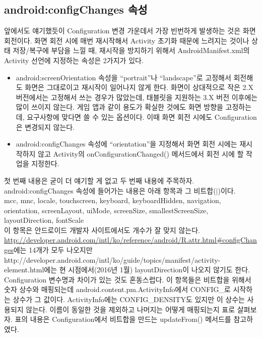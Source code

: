 \subsection{android:configChanges 속성}
앞에서도 얘기했듯이 Configuration 변경 가운데서 가장 빈번하게 발생하는 것은 화면 회전이다. 화면 회전 시에 매번 재시작해서 Activity 초기화 때문에 느려지는 것이나 상태 저장/복구에 부담을 느낄 때, 재시작을 방지하기 위해서 AndroidManifest.xml의 Activity 선언에 지정하는 속성은 2가지가 있다.
\begin{itemize}
\item android:screenOrientation 속성을 ``portrait''나 ``landscape''로 고정해서 회전해도 화면은 그대로이고 재시작이 일어나지 않게 한다. 화면이 상대적으로 작은 2.X 버전에서는 고정해서 쓰는 경우가 많았는데, 태블릿을 지원하는 3.X 버전 이후에는 많이 쓰이지 않는다. 게임 앱과 같이 용도가 확실한 것에도 화면 방향을 고정하는데, 요구사항에 맞다면 쓸 수 있는 옵션이다. 이때 화면 회전 시에도 Configuration은 변경되지 않는다.
\item android:configChanges 속성에 ``orientation''을 지정해서 화면 회전 시에는 재시작하지 않고 Activity의 onConfigurationChanged() 메서드에서 회전 시에 할 작업을 지정한다.
\end{itemize}

첫 번째 내용은 굳이 더 얘기할 게 없고 두 번째 내용에 주목하자.
android:configChanges 속성에 들어가는 내용은 아래 항목과 그 비트합($|$)이다.\\
mcc, mnc, locale,
touchscreen, keyboard, keyboardHidden, 
navigation, orientation, screenLayout, uiMode, screenSize,
smallestScreenSize, layoutDirection, fontScale\\

이 항목은 안드로이드 개발자 사이트에서도 개수가 잘 맞지 않는다. \url{http://developer.android.com/intl/ko/reference/android/R.attr.html\#configChanges}에는 14개가 모두 나오지만 http://developer.android.com/intl/ko/guide/topics/manifest/activity-element.html에는 현 시점에서(2016년 1월) layoutDirection이 나오지 않기도 한다.\\

Configuration 변수명과 차이가 있는 것도 혼동스럽다. 이 항목들은 비트합을 위해서 숫자 상수와 매핑되는데 android.content.pm.ActivityInfo에서 CONFIG\_로 시작하는 상수가 그 값이다.
ActivityInfo에는 CONFIG\_DENSITY도 있지만 이 상수는 사용되지 않는다.
이름이 동일한 것을 제외하고 나머지는 어떻게 매핑되는지 표로 살펴보자. 표의 내용은 Configuration에서 비트합을 만드는 updateFrom() 메서드를 참고하였다.\\

